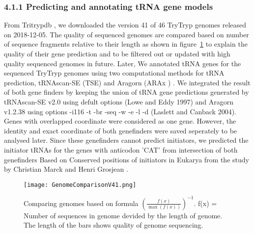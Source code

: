 \documentclass[
12pt, %
a4paper, %
oneside, %
headinclude,footinclude, %
BCOR5mm, %
]{scrartcl}
\begin{document}
\subsubsection*{4.1.1 Predicting and annotating tRNA gene models}
From Tritrypdb \cite{Aslett2010TriTrypDBAF}, we downloaded the version 41 of 46 TryTryp genomes released on 2018-12-05. The quality of sequenced genomes are compared based on number of sequence fragments relative to their length as shown in figure~\ref{fig:gallery} to explain the quality of their gene prediction and to be filtered out or updated with high quality sequenced genomes in future. Later, We annotated tRNA genes for the sequenced TryTryp genomes using two computational methods for tRNA prediction, tRNAscan-SE (TSE) \cite{trnascan} and Aragorn (ARAx	) \cite{aragorn}. We integrated the result of both gene finders by keeping the union of tRNA gene predictions generated by tRNAscan-SE v2.0 using defult options (Lowe and Eddy 1997) and Aragorn v1.2.38 using options -i116 -t -br -seq -w -e -l -d (Laslett and Canback 2004). Genes with overlapped coordinate were considered as one gene. However, the identity and exact coordinate of both genefinders were saved seperately to be analysed later. Since these genefinders cannot predict initiators, we predicted the initiator tRNAs for the genes with anticodon 'CAT' from intersection of both genefinders Based on Conserved positions of initiators in Eukarya from the study by Christian Marck and Henri Grosjean \cite{tRNomics}.

\begin{figure}[tb]
\centering 
\texttt{[image: GenomeComparisonV41.png]} 
\caption[Genome Comparison]{Comparing genomes based on formula ${(\frac{f(x)}{\max(f(x))})}^{-1}$. f(x) = Number of sequences in genome devided by the length of genome. The length of the bars shows quality of genome sequencing.} %
\label{fig:gallery} 
\end{figure}
\end{document}
